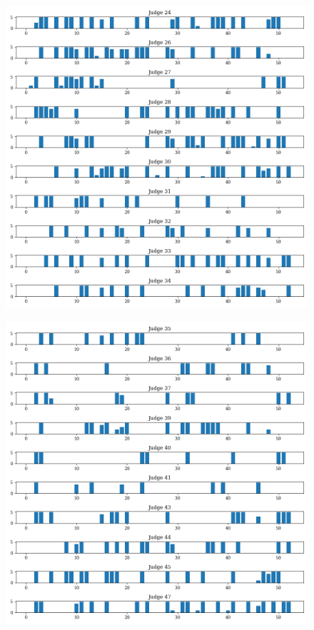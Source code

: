 \documentclass[11pt]{article}
\begin{document}
  \begin{figure}[H]
    \centering
    \includegraphics[width=\textwidth]{../../../output/figures/Exploration/JudgeID_weekly_judge_days_2}
  \end{figure}

  \begin{figure}[H]
    \centering
    \includegraphics[width=\textwidth]{../../../output/figures/Exploration/JudgeID_weekly_judge_days_3}
  \end{figure}
\end{document}
